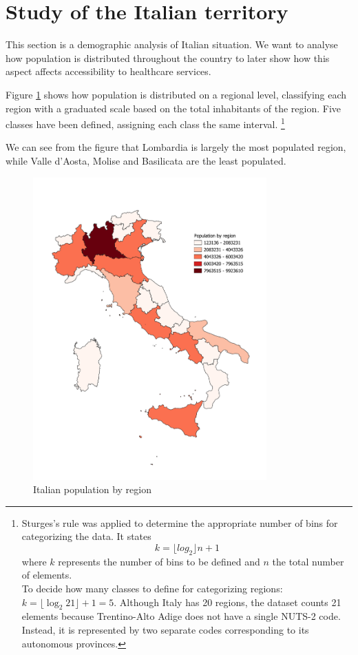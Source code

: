 \section{Study of the Italian territory}

This section is a demographic analysis of Italian situation. We want to analyse how population is distributed throughout the country to later show how this aspect affects accessibility to healthcare services.

Figure \ref{fig:pop_by_region} shows how population is distributed on a regional level, classifying each region with a graduated scale based on the total inhabitants of the region.
Five classes have been defined, assigning each class the same interval.
\footnote{Sturges's rule was applied to determine the appropriate number of bins for categorizing the data.
	It states
	\begin{equation*}
		k = \lfloor log_2 \rfloor n +1
	\end{equation*}
	where $k$ represents the number of bins to be defined and $n$ the total number of elements.\\
	To decide how many classes to define for categorizing regions: $k = \lfloor \log_2 21 \rfloor + 1 = 5$.
	Although Italy has 20 regions, the dataset counts 21 elements because Trentino-Alto Adige does not have a single NUTS-2 code. Instead, it is represented by two separate codes corresponding to its autonomous provinces.}
	
We can see from the figure that Lombardia is largely the most populated region, while Valle d'Aosta, Molise and Basilicata are the least populated.


\begin{figure}[tb]
	\centering
	\includegraphics[width=0.8\textwidth]{img/regioni per popolazione.pdf}
	\caption{Italian population by region}
	\label{fig:pop_by_region}
\end{figure}

